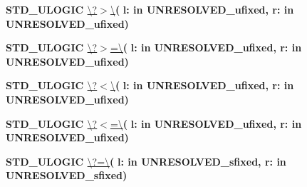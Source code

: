 \begin{DoxyCompactItemize}
{\bfseries {\bfseries \textcolor{comment}{S\+T\+D\+\_\+\+U\+L\+O\+G\+I\+C}\textcolor{vhdlchar}{ }}} \hyperlink{classfixed__pkg_a255dae6821ca0cde38c9cb50f0669430}{\textbackslash{}?$>$\textbackslash{}}{\bfseries  ( }{\bfseries \textcolor{vhdlchar}{l\+: }\textcolor{stringliteral}{in }\textcolor{vhdlchar}{U\+N\+R\+E\+S\+O\+L\+V\+E\+D\+\_\+ufixed}}{\bfseries  , \textcolor{vhdlchar}{r\+: }\textcolor{stringliteral}{in }\textcolor{vhdlchar}{U\+N\+R\+E\+S\+O\+L\+V\+E\+D\+\_\+ufixed}}{\bfseries  )} 
\item 
{\bfseries {\bfseries \textcolor{comment}{S\+T\+D\+\_\+\+U\+L\+O\+G\+I\+C}\textcolor{vhdlchar}{ }}} \hyperlink{classfixed__pkg_aec60ec8548aac7b2ab232a0736633a3f}{\textbackslash{}?$>$=\textbackslash{}}{\bfseries  ( }{\bfseries \textcolor{vhdlchar}{l\+: }\textcolor{stringliteral}{in }\textcolor{vhdlchar}{U\+N\+R\+E\+S\+O\+L\+V\+E\+D\+\_\+ufixed}}{\bfseries  , \textcolor{vhdlchar}{r\+: }\textcolor{stringliteral}{in }\textcolor{vhdlchar}{U\+N\+R\+E\+S\+O\+L\+V\+E\+D\+\_\+ufixed}}{\bfseries  )} 
\item 
{\bfseries {\bfseries \textcolor{comment}{S\+T\+D\+\_\+\+U\+L\+O\+G\+I\+C}\textcolor{vhdlchar}{ }}} \hyperlink{classfixed__pkg_a7cd0b020d4367e68cc8e5898e519f0b0}{\textbackslash{}?$<$\textbackslash{}}{\bfseries  ( }{\bfseries \textcolor{vhdlchar}{l\+: }\textcolor{stringliteral}{in }\textcolor{vhdlchar}{U\+N\+R\+E\+S\+O\+L\+V\+E\+D\+\_\+ufixed}}{\bfseries  , \textcolor{vhdlchar}{r\+: }\textcolor{stringliteral}{in }\textcolor{vhdlchar}{U\+N\+R\+E\+S\+O\+L\+V\+E\+D\+\_\+ufixed}}{\bfseries  )} 
\item 
{\bfseries {\bfseries \textcolor{comment}{S\+T\+D\+\_\+\+U\+L\+O\+G\+I\+C}\textcolor{vhdlchar}{ }}} \hyperlink{classfixed__pkg_a52cea50a28a3ac135e780eb2b2f7c474}{\textbackslash{}?$<$=\textbackslash{}}{\bfseries  ( }{\bfseries \textcolor{vhdlchar}{l\+: }\textcolor{stringliteral}{in }\textcolor{vhdlchar}{U\+N\+R\+E\+S\+O\+L\+V\+E\+D\+\_\+ufixed}}{\bfseries  , \textcolor{vhdlchar}{r\+: }\textcolor{stringliteral}{in }\textcolor{vhdlchar}{U\+N\+R\+E\+S\+O\+L\+V\+E\+D\+\_\+ufixed}}{\bfseries  )} 
\item 
{\bfseries {\bfseries \textcolor{comment}{S\+T\+D\+\_\+\+U\+L\+O\+G\+I\+C}\textcolor{vhdlchar}{ }}} \hyperlink{classfixed__pkg_a2d4857284cabcf55fd984b2bbe6e0e1b}{\textbackslash{}?=\textbackslash{}}{\bfseries  ( }{\bfseries \textcolor{vhdlchar}{l\+: }\textcolor{stringliteral}{in }\textcolor{vhdlchar}{U\+N\+R\+E\+S\+O\+L\+V\+E\+D\+\_\+sfixed}}{\bfseries  , \textcolor{vhdlchar}{r\+: }\textcolor{stringliteral}{in }\textcolor{vhdlchar}{U\+N\+R\+E\+S\+O\+L\+V\+E\+D\+\_\+sfixed}}{\bfseries  )} 

\end{DoxyCompactItemize}
